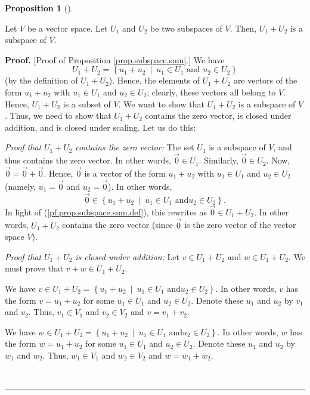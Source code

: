 \documentclass[numbers=enddot,12pt,final,onecolumn,notitlepage]{scrartcl}%
\theoremstyle{definition}
\newtheorem{prop}[theo]{Proposition}
\newenvironment{proposition}[1][]
{\begin{prop}[#1]\begin{leftbar}}
{\end{leftbar}\end{prop}}
\newenvironment{proof}[1][Proof]{\noindent\textbf{#1.} }{\ \rule{0.5em}{0.5em}}
\begin{document}
\begin{proposition}
\label{prop.subspace.sum}Let $V$ be a vector space. Let $U_{1}$ and $U_{2}$ be
two subspaces of $V$. Then, $U_{1}+U_{2}$ is a subspace of $V$.
\end{proposition}

\begin{proof}
[Proof of Proposition \ref{prop.subspace.sum}.] We have%
\begin{equation}
U_{1}+U_{2}=\left\{  u_{1}+u_{2}\ \mid\ u_{1}\in U_{1}\text{ and }u_{2}\in
U_{2}\right\}  \label{pf.prop.subspace.sum.def}%
\end{equation}
(by the definition of $U_{1}+U_{2}$). Hence, the elements of $U_{1}+U_{2}$ are
vectors of the form $u_{1}+u_{2}$ with $u_{1}\in U_{1}$ and $u_{2}\in U_{2}$;
clearly, these vectors all belong to $V$. Hence, $U_{1}+U_{2}$ is a subset of
$V$. We want to show that $U_{1}+U_{2}$ is a subspace of $V$. Thus, we need to
show that $U_{1}+U_{2}$ contains the zero vector, is closed under addition,
and is closed under scaling. Let us do this:

\textit{Proof that }$U_{1}+U_{2}$\textit{ contains the zero vector:} The set
$U_{1}$ is a subspace of $V$, and thus contains the zero vector. In other
words, $\overrightarrow{0}\in U_{1}$. Similarly, $\overrightarrow{0}\in U_{2}%
$. Now, $\overrightarrow{0}=\overrightarrow{0}+\overrightarrow{0}$. Hence,
$\overrightarrow{0}$ is a vector of the form $u_{1}+u_{2}$ with $u_{1}\in
U_{1}$ and $u_{2}\in U_{2}$ (namely, $u_{1}=\overrightarrow{0}$ and
$u_{2}=\overrightarrow{0}$). In other words,%
\[
\overrightarrow{0}\in\left\{  u_{1}+u_{2}\ \mid\ u_{1}\in U_{1}\text{ and
}u_{2}\in U_{2}\right\}  .
\]
In light of (\ref{pf.prop.subspace.sum.def}), this rewrites as
$\overrightarrow{0}\in U_{1}+U_{2}$. In other words, $U_{1}+U_{2}$ contains
the zero vector (since $\overrightarrow{0}$ is the zero vector of the vector
space $V$).

\textit{Proof that }$U_{1}+U_{2}$ \textit{is closed under addition:} Let $v\in
U_{1}+U_{2}$ and $w\in U_{1}+U_{2}$. We must prove that $v+w\in U_{1}+U_{2}$.

We have $v\in U_{1}+U_{2}=\left\{  u_{1}+u_{2}\ \mid\ u_{1}\in U_{1}\text{ and
}u_{2}\in U_{2}\right\}  $. In other words, $v$ has the form $v=u_{1}+u_{2}$
for some $u_{1}\in U_{1}$ and $u_{2}\in U_{2}$. Denote these $u_{1}$ and
$u_{2}$ by $v_{1}$ and $v_{2}$. Thus, $v_{1}\in V_{1}$ and $v_{2}\in V_{2}$
and $v=v_{1}+v_{2}$.

We have $w\in U_{1}+U_{2}=\left\{  u_{1}+u_{2}\ \mid\ u_{1}\in U_{1}\text{ and
}u_{2}\in U_{2}\right\}  $. In other words, $w$ has the form $w=u_{1}+u_{2}$
for some $u_{1}\in U_{1}$ and $u_{2}\in U_{2}$. Denote these $u_{1}$ and
$u_{2}$ by $w_{1}$ and $w_{2}$. Thus, $w_{1}\in V_{1}$ and $w_{2}\in V_{2}$
and $w=w_{1}+w_{2}$.


\end{proof}
\end{document}
